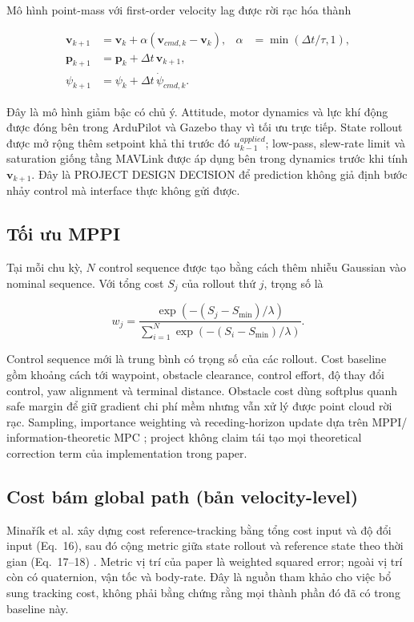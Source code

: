 \documentclass[11pt,a4paper]{article}
\newcommand{\vect}[1]{\bm{#1}}
\begin{document}
Mô hình point-mass với first-order velocity lag được rời rạc hóa thành

\begin{align}
\vect v_{k+1} &= \vect v_k + \alpha(\vect v_{cmd,k}-\vect v_k),
& \alpha &= \min(\Delta t/\tau,1),\\
\vect p_{k+1} &= \vect p_k + \Delta t\,\vect v_{k+1},\\
\psi_{k+1} &= \psi_k + \Delta t\,\dot\psi_{cmd,k}.
\end{align}

Đây là mô hình giảm bậc có chủ ý. Attitude, motor dynamics và lực khí động được
đóng bên trong ArduPilot và Gazebo thay vì tối ưu trực tiếp. State rollout được
mở rộng thêm setpoint khả thi trước đó $u^{applied}_{k-1}$; low-pass, slew-rate
limit và saturation giống tầng MAVLink được áp dụng bên trong dynamics trước
khi tính $\vect v_{k+1}$. Đây là PROJECT DESIGN DECISION để prediction không
giả định bước nhảy control mà interface thực không gửi được.

\subsection{Tối ưu MPPI}

Tại mỗi chu kỳ, $N$ control sequence được tạo bằng cách thêm nhiễu Gaussian
vào nominal sequence. Với tổng cost $S_j$ của rollout thứ $j$, trọng số là

\begin{equation}
w_j = \frac{\exp(-(S_j-S_{\min})/\lambda)}
{\sum_{i=1}^{N}\exp(-(S_i-S_{\min})/\lambda)}.
\end{equation}

Control sequence mới là trung bình có trọng số của các rollout. Cost baseline
gồm khoảng cách tới waypoint, obstacle clearance, control effort, độ thay đổi
control, yaw alignment và terminal distance. Obstacle cost dùng softplus quanh
safe margin để giữ gradient chi phí mềm nhưng vẫn xử lý được point cloud rời rạc.
Sampling, importance weighting và receding-horizon update dựa trên MPPI/
information-theoretic MPC \cite{williams2018itmppi}; project không claim tái tạo
mọi theoretical correction term của implementation trong paper.

\subsection{Cost bám global path (bản velocity-level)}

Minařík et al. xây dựng cost reference-tracking bằng tổng cost input và độ đổi
input (Eq.~16), sau đó cộng metric giữa state rollout và reference state theo
thời gian (Eq.~17--18) \cite{minarik2024agilemppi}. Metric vị trí của paper là
weighted squared error; ngoài vị trí còn có quaternion, vận tốc và body-rate.
Đây là nguồn tham khảo cho việc bổ sung tracking cost, không phải bằng chứng
rằng mọi thành phần đó đã có trong baseline này.
\end{document}
